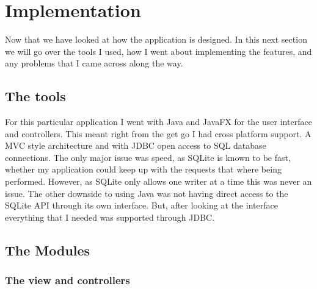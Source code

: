 \section{Implementation}
\label{sec:implementation}

Now that we have looked at how the application is designed. In this next section we will go over the tools I used, how I went about implementing the features, and any problems that I came across along the way.   

\subsection{The tools}
\label{subsec:the_tools}

For this particular application I went with Java and JavaFX for the user interface and controllers. This meant right from the get go I had cross platform support. A MVC style architecture and with JDBC open access to SQL database connections. The only major issue was speed, as SQLite is known to be fast, whether my application could keep up with the requests that where being performed. However, as SQLite only allows one writer at a time this was never an issue. The other downside to using Java was not having direct access to the SQLite API through its own interface. But, after looking at the interface everything that I needed was supported through JDBC.

\subsection{The Modules}
\label{subsec:the_modules}

\subsubsection{The view and controllers}
\label{subsubsec:imp_veiw}

